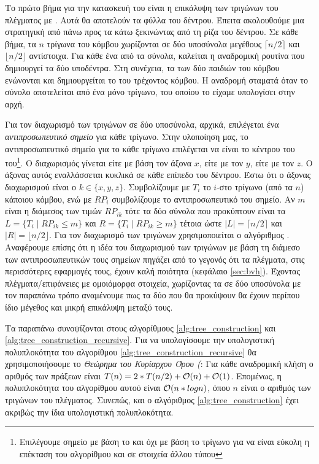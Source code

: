 Το πρώτο βήμα για την κατασκευή του  είναι η επικάλυψη 
των τριγώνων του πλέγματος με .
Αυτά θα αποτελούν τα φύλλα του δέντρου.
Έπειτα ακολουθούμε μια στρατηγική από πάνω προς τα κάτω ξεκινώντας 
από τη ρίζα του δέντρου. 
Σε κάθε βήμα, τα $n$ τρίγωνα του κόμβου χωρίζονται σε δύο υποσύνολα 
μεγέθους $\lceil n/2 \rceil$ και $\lfloor n/2\rfloor$ αντίστοιχα.
Για κάθε ένα από τα σύνολα, καλείται η αναδρομική ρουτίνα που δημιουργεί 
τα δύο υποδέντρα.  
Στη συνέχεια, τα  των δύο παιδιών του κόμβου ενώνονται 
και δημιουργείται το  του τρέχοντος κόμβου.
Η αναδρομή σταματά όταν το σύνολο αποτελείται από ένα μόνο τρίγωνο, 
του οποίου το  είχαμε υπολογίσει στην αρχή.

Για τον διαχωρισμό των τριγώνων σε δύο υποσύνολα, αρχικά, επιλέγεται 
ένα \textit{αντιπροσωπευτικό σημείο} για κάθε τρίγωνο.
Στην υλοποίηση μας, το αντιπροσωπευτικό σημείο για το κάθε τρίγωνο 
επιλέγεται να είναι το κέντρου του  του\footnote{Επιλέγουμε 
σημείο με βάση το  και όχι με βάση το τρίγωνο για να είναι 
εύκολη η επέκταση του αλγορίθμου και σε στοιχεία άλλου τύπου}.
Ο διαχωρισμός γίνεται είτε με βάση τον άξονα $x$, είτε με τον $y$, είτε 
με τον $z$.
Ο άξονας αυτός εναλλάσσεται κυκλικά σε κάθε επίπεδο του δέντρου.
Έστω ότι ο άξονας διαχωρισμού είναι ο $k \in \{x,y,z\}$. 
Συμβολίζουμε με $T_i$ το $i$-στο τρίγωνο (από τα $n$)
κάποιου κόμβου, ενώ με $RP_i$ συμβολίζουμε το αντιπροσωπευτικό του 
σημείο.
Αν $m$ είναι η διάμεσος των τιμών $RP_{ik}$ τότε τα δύο σύνολα 
που προκύπτουν είναι τα $L = \{T_i \mid RP_{ik} \leq m \}$ και 
$R = \{T_i  \mid  RP_{ik} \geq m \}$ 
τέτοια ώστε 
$|L| = \lceil n/2 \rceil$ και $|R| = \lfloor n/2 \rfloor$.
Για τον διαχωρισμό των τριγώνων χρησιμοποιείται ο 
αλγόριθμος  \cite{hoare1961algorithm}.
Αναφέρουμε επίσης ότι η ιδέα του διαχωρισμού των τριγώνων με 
βάση τη διάμεσο των αντιπροσωπευτικών τους σημείων πηγάζει από 
το γεγονός ότι τα πλέγματα, στις περισσότερες εφαρμογές τους,
έχουν καλή ποιότητα (κεφάλαιο \ref{sec:bvh}).
Έχοντας πλέγματα/επιφάνειες με ομοιόμορφα στοιχεία, χωρίζοντας τα σε 
δύο υποσύνολα με τον παραπάνω τρόπο αναμένουμε πως τα δύο 
που θα προκύψουν θα έχουν περίπου ίδιο μέγεθος και μικρή επικάλυψη 
μεταξύ τους.

Τα παραπάνω συνοψίζονται στους αλγορίθμους \ref{alg:tree_construction} και 
\ref{alg:tree_construction_recursive}.
Για να υπολογίσουμε την υπολογιστική πολυπλοκότητα του αλγορίθμου 
\ref{alg:tree_construction_recursive} θα χρησιμοποιήσουμε το 
\textit{Θεώρημα του Κυρίαρχου Όρου (}:
Για κάθε αναδρομική κλήση ο αριθμός των πράξεων είναι 
$T(n) = 2*T(n/2) + \mathcal{O}(n) + \mathcal{O}(1)$.
Επομένως, η πολυπλοκότητα του αλγορίθμου αυτού είναι 
$\mathcal{O}(n*logn)$, όπου $n$ είναι ο αριθμός των τριγώνων 
του πλέγματος.
Συνεπώς, και ο αλγόριθμος \ref{alg:tree_construction} έχει 
ακριβώς την ίδια υπολογιστική πολυπλοκότητα.

